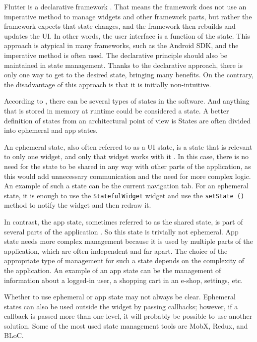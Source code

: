 Flutter is a declarative framework \cite{a2022_flutter_declarative}.
That means the framework does not use an imperative method to manage widgets and other framework parts, but rather the framework expects that state changes, and the framework then rebuilds and updates the UI.
In other words, the user interface is a function of the state.
This approach is atypical in many frameworks, such as the Android SDK, and the imperative method is often used.
The declarative principle should also be maintained in state management.
Thanks to the declarative approach, there is only one way to get to the desired state, bringing many benefits.
On the contrary, the disadvantage of this approach is that it is initially non-intuitive.

According to \cite{a2022_differentiate}, there can be several types of states in the software.
And anything that is stored in memory at runtime could be considered a state.
A better definition of states from an architectural point of view is 
States are often divided into ephemeral and app states.

An ephemeral state, also often referred to as a UI state, is a state that is relevant to only one widget, and only that widget works with it \cite{a2022_differentiate}.
In this case, there is no need for the state to be shared in any way with other parts of the application, as this would add unnecessary communication and the need for more complex logic.
An example of such a state can be the current navigation tab.
For an ephemeral state, it is enough to use the \texttt {StatefulWidget} widget and use the \texttt{setState ()} method to notify the widget and then redraw it.

In contrast, the app state, sometimes referred to as the shared state, is part of several parts of the application \cite{a2022_differentiate}.
So this state is trivially not ephemeral.
App state needs more complex management because it is used by multiple parts of the application, which are often independent and far apart.
The choice of the appropriate type of management for such a state depends on the complexity of the application.
An example of an app state can be the management of information about a logged-in user, a shopping cart in an e-shop, settings, etc.

Whether to use ephemeral or app state may not always be clear.
Ephemeral states can also be used outside the widget by passing callbacks; however, if a callback is passed more than one level, it will probably be possible to use another solution.
Some of the most used state management tools are MobX, Redux, and BLoC.

